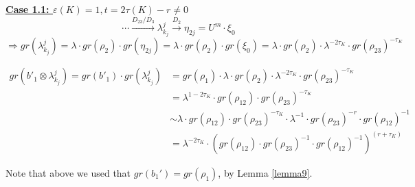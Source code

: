\documentclass[11pt,reqno]{amsart}
\theoremstyle{definition}
\newtheorem *{remark}{Remark}
\begin{document}
\begin{subsection}{\underline{\textbf{Case 1.1: $\varepsilon(K)=1, t = 2 \tau(K) - r \neq 0$}}}
 \[\cdots \xrightarrow{D_{23}/ D_3} \lambda^j_{k_j} \xrightarrow{D_2} \eta_{2j}= U^m \cdot \xi_0\] \[\Rightarrow gr(\lambda^j_{k_j}) = \lambda \cdot gr(\rho_2)\cdot gr(\eta_{2j}) = \lambda \cdot gr(\rho_2)\cdot gr(\xi_0) = \lambda \cdot gr(\rho_2) \cdot \lambda^{-2\tau_K}\cdot gr(\rho_{23})^{-\tau_K}\]




\begin{align*}
    gr(b'_1 \otimes \lambda^j_{k_j})  = gr(b'_1) \cdot gr(\lambda^j_{k_j}) &= gr(\rho_1) \cdot \lambda \cdot gr(\rho_2) \cdot \lambda^{-2\tau_K}\cdot gr(\rho_{23})^{-\tau_K}\\
    &= \lambda^{1-2\tau_K} \cdot gr(\rho_{12})\cdot gr(\rho_{23})^{-\tau_K}\\
    & \sim \lambda \cdot gr(\rho_{12}) \cdot gr(\rho_{23})^{-\tau_K} \cdot \lambda^{-1} \cdot gr(\rho_{23})^{-r} \cdot gr(\rho_{12})^{-1} \\
    &=\lambda^{-2\tau_K} \cdot (gr(\rho_{12})\cdot gr(\rho_{23})^{-1} \cdot gr(\rho_{12})^{-1})^{(r+\tau_K)}
\end{align*}

Note that above we used that $gr(b_1') = gr(\rho_1)$, by Lemma \ref{lemma9}.



\end{subsection}
\end{document}
